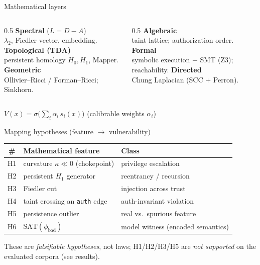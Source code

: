 \documentclass[aspectratio=169,11pt]{beamer}
\begin{document}
\begin{frame}{Mathematical layers}
  \begin{columns}[T]
    \begin{column}{0.5\textwidth}
      \textbf{Spectral} ($L=D-A$)\\
      $\lambda_2$, Fiedler vector, embedding.
      \vspace{2mm}
      \textbf{Topological (TDA)}\\
      persistent homology $H_0,H_1$, Mapper.
      \vspace{2mm}
      \textbf{Geometric}\\
      Ollivier--Ricci / Forman--Ricci; Sinkhorn.
    \end{column}
    \begin{column}{0.5\textwidth}
      \textbf{Algebraic}\\
      taint lattice; authorization order.
      \vspace{2mm}
      \textbf{Formal}\\
      symbolic execution $+$ SMT (Z3); reachability.
      \vspace{2mm}
      \textbf{Directed}\\
      Chung Laplacian (SCC $+$ Perron).
    \end{column}
  \end{columns}
  \vspace{3mm}
  \begin{center}
  $V(x) = \sigma\!\big(\sum_i \alpha_i\, s_i(x)\big)$ \quad (calibrable weights $\alpha_i$)
  \end{center}
\end{frame}

\begin{frame}{Mapping hypotheses (feature $\to$ vulnerability)}
  \begin{center}
  \begin{tabular}{cll}
  \toprule
  \# & Mathematical feature & Class \\
  \midrule
  H1 & curvature $\kappa \ll 0$ (chokepoint) & privilege escalation \\
  H2 & persistent $H_1$ generator & reentrancy / recursion \\
  H3 & Fiedler cut & injection across trust \\
  H4 & taint crossing an \texttt{auth} edge & auth-invariant violation \\
  H5 & persistence outlier & real vs.\ spurious feature \\
  H6 & $\mathrm{SAT}(\phi_{\text{bad}})$ & model witness (encoded semantics) \\
  \bottomrule
  \end{tabular}
  \end{center}
  \vspace{2mm}
  \footnotesize These are \emph{falsifiable hypotheses}, not laws; H1/H2/H3/H5 are
  \emph{not supported} on the evaluated corpora (see results).
\end{frame}
\end{document}
